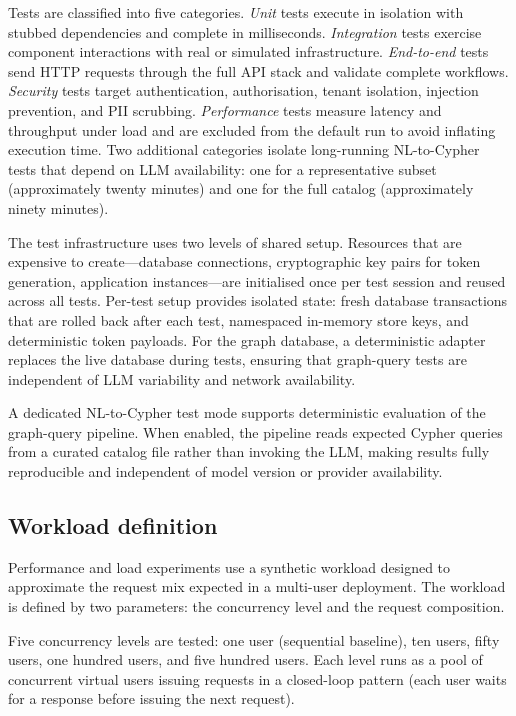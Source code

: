 \documentclass[a4paper]{sapthesis}
\begin{document}
Tests are classified into five categories.  \emph{Unit} tests
execute in isolation with stubbed dependencies and complete in
milliseconds.  \emph{Integration} tests exercise component interactions
with real or simulated infrastructure.  \emph{End-to-end} tests send
HTTP requests through the full API stack and validate complete workflows.
\emph{Security} tests target authentication, authorisation, tenant
isolation, injection prevention, and PII scrubbing.  \emph{Performance}
tests measure latency and throughput under load and are excluded from the
default run to avoid inflating execution time.  Two additional categories
isolate long-running NL-to-Cypher tests that depend on LLM availability:
one for a representative subset (approximately twenty minutes) and one
for the full catalog (approximately ninety minutes).

The test infrastructure uses two levels of shared setup.  Resources that
are expensive to create---database connections, cryptographic key pairs
for token generation, application instances---are initialised once per
test session and reused across all tests.  Per-test setup provides
isolated state: fresh database transactions that are rolled back after
each test, namespaced in-memory store keys, and deterministic token
payloads.  For the graph database, a deterministic adapter replaces the
live database during tests, ensuring that graph-query tests are
independent of LLM variability and network availability.

A dedicated NL-to-Cypher test mode supports deterministic evaluation of
the graph-query pipeline.  When enabled, the pipeline reads expected
Cypher queries from a curated catalog file rather than invoking the LLM,
making results fully reproducible and independent of model version or
provider availability.

\subsection{Workload definition}

Performance and load experiments use a synthetic workload designed to
approximate the request mix expected in a multi-user deployment.  The
workload is defined by two parameters: the concurrency level and the
request composition.

Five concurrency levels are tested: one user (sequential baseline), ten
users, fifty users, one hundred users, and five hundred users.  Each
level runs as a pool of concurrent virtual users issuing requests in a
closed-loop pattern (each user waits for a response before issuing the
next request).
\end{document}
